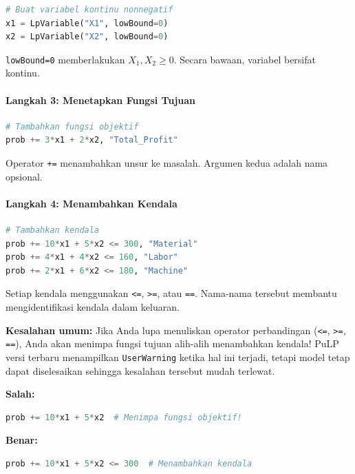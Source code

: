 \begin{lstlisting}[language=Python]
# Buat variabel kontinu nonnegatif
x1 = LpVariable("X1", lowBound=0)
x2 = LpVariable("X2", lowBound=0)
\end{lstlisting}

\texttt{lowBound=0} memberlakukan $X_1, X_2 \geq 0$. Secara bawaan, variabel bersifat kontinu.

\paragraph{Langkah 3: Menetapkan Fungsi Tujuan}

\begin{lstlisting}[language=Python]
# Tambahkan fungsi objektif
prob += 3*x1 + 2*x2, "Total_Profit"
\end{lstlisting}

Operator \texttt{+=} menambahkan unsur ke masalah. Argumen kedua adalah nama opsional.

\paragraph{Langkah 4: Menambahkan Kendala}

\begin{lstlisting}[language=Python]
# Tambahkan kendala
prob += 10*x1 + 5*x2 <= 300, "Material"
prob += 4*x1 + 4*x2 <= 160, "Labor"
prob += 2*x1 + 6*x2 <= 180, "Machine"
\end{lstlisting}

Setiap kendala menggunakan \texttt{<=}, \texttt{>=}, atau \texttt{==}. Nama-nama tersebut membantu mengidentifikasi kendala dalam keluaran.

\begin{warn}
\textbf{Kesalahan umum:} Jika Anda lupa menuliskan operator perbandingan (\texttt{<=}, \texttt{>=}, \texttt{==}), Anda akan menimpa fungsi tujuan alih-alih menambahkan kendala! PuLP versi terbaru menampilkan \texttt{UserWarning} ketika hal ini terjadi, tetapi model tetap dapat diselesaikan sehingga kesalahan tersebut mudah terlewat.

\textbf{Salah:}
\begin{lstlisting}[language=Python]
prob += 10*x1 + 5*x2  # Menimpa fungsi objektif!
\end{lstlisting}

\textbf{Benar:}
\begin{lstlisting}[language=Python]
prob += 10*x1 + 5*x2 <= 300  # Menambahkan kendala
\end{lstlisting}
\end{warn}

